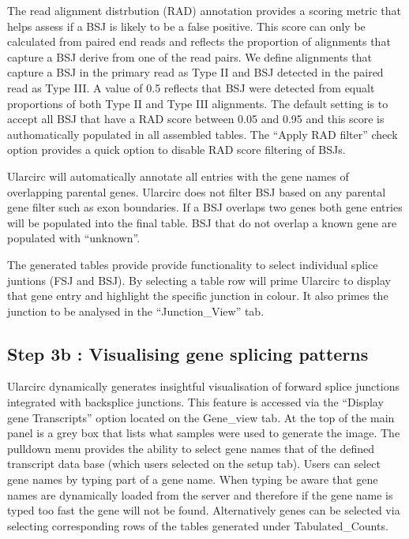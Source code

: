 \documentclass[12pt]{article}
\begin{document}
The read alignment distrbution (RAD) annotation provides a scoring metric that helps assess if a BSJ is likely to be a false positive. This score can only be calculated from paired end reads and reflects the proportion of alignments that capture a BSJ derive from one of the read pairs. We define alignments that capture a BSJ in the primary read as Type II and BSJ detected in the paired read as Type III. A value of 0.5 reflects that BSJ were detected from equalt proportions of both Type II and Type III alignments. The default setting is to accept all BSJ that have a RAD score between 0.05 and 0.95 and this score is authomatically populated in all assembled tables. The ``Apply RAD filter'' check option provides a quick option to disable RAD score filtering of BSJs.  \par

Ularcirc will automatically annotate all entries with the gene names of overlapping parental genes. Ularcirc does not filter BSJ based on any parental gene filter such as exon boundaries. If a BSJ overlaps two genes both gene entries will be populated into the final table. BSJ that do not overlap a known gene are populated with ``unknown''. \par

The generated tables provide provide functionality to select individual splice juntions (FSJ and BSJ). By selecting a table row will prime Ularcirc to display that gene entry and highlight the specific junction in colour. It also primes the junction to be analysed in the ``Junction\_View'' tab.


\subsection{Step 3b : Visualising gene splicing patterns} \label{sec:Step3b}
Ularcirc dynamically generates insightful visualisation of forward splice junctions integrated with backsplice junctions. This feature is accessed via the ``Display gene Transcripts'' option located on the Gene\_view tab. At the top of the main panel is a grey box that lists what samples were used to generate the image. The pulldown menu provides the ability to select gene names that of the defined transcript data base (which users selected on the setup tab). Users can select gene names by typing part of a gene name. When typing  be aware that gene names are dynamically loaded from the server and therefore if the gene name is typed too fast the gene will not be found.  Alternatively genes can be selected via selecting corresponding rows of the tables generated under Tabulated\_Counts. \par
\end{document}
